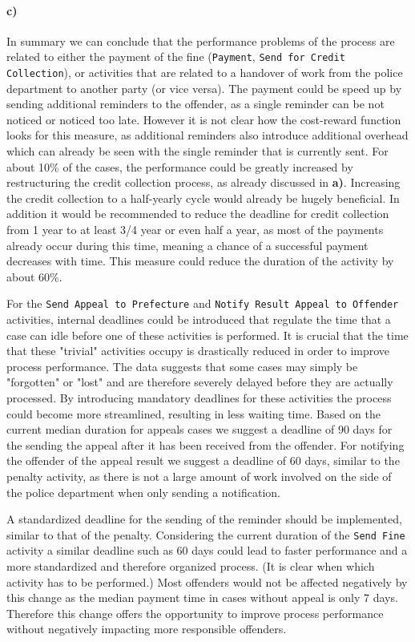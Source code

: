 \documentclass[12pt]{report}
\begin{document}
\paragraph{\textbf{c)}}

In summary we can conclude that the performance problems of the process are related to either the payment of the fine (\texttt{Payment}, \texttt{Send for Credit Collection}), or activities that are related to a handover of work from the police department to another party (or vice versa). The payment could be speed up by sending additional reminders to the offender, as a single reminder can be not noticed or noticed too late. However it is not clear how the cost-reward function looks for this measure, as additional reminders also introduce additional overhead which can already be seen with the single reminder that is currently sent. For about 10\% of the cases, the performance could be greatly increased by restructuring the credit collection process, as already discussed in \textbf{a)}. Increasing the credit collection to a half-yearly cycle would already be hugely beneficial. In addition it would be recommended to reduce the deadline for credit collection from 1 year to at least 3/4 year or even half a year, as most of the payments already occur during this time, meaning a chance of a successful payment decreases with time. This measure could reduce the duration of the activity by about 60\%.

For the \texttt{Send Appeal to Prefecture} and \texttt{Notify Result Appeal to Offender} activities, internal deadlines could be introduced that regulate the time that a case can idle before one of these activities is performed. It is crucial that the time that these "trivial" activities occupy is drastically reduced in order to improve process performance. The data suggests that some cases may simply be "forgotten" or "lost" and are therefore severely delayed before they are actually processed. By introducing mandatory deadlines for these activities the process could become more streamlined, resulting in less waiting time. Based on the current median duration for appeals cases we suggest a deadline of 90 days for the sending the appeal after it has been received from the offender. For notifying the offender of the appeal result we suggest a deadline of 60 days, similar to the penalty activity, as there is not a large amount of work involved on the side of the police department when only sending a notification.

A standardized deadline for the sending of the reminder should be implemented, similar to that of the penalty. Considering the current duration of the \texttt{Send Fine} activity a similar deadline such as 60 days could lead to faster performance and a more standardized and therefore organized process. (It is clear when which activity has to be performed.) Most offenders would not be affected negatively by this change as the median payment time in cases without appeal is only 7 days. Therefore this change offers the opportunity to improve process performance without negatively impacting more responsible offenders.
\end{document}

